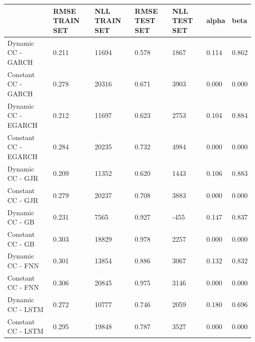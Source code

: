 \documentclass[a4paper, oneside]{discothesis}
\begin{document}
\begin{table}[!ht]\label{tbl_md_2}
    \centering
    \scriptsize
    \begin{tabular}{|p{3.5cm}||p{1.1cm}|p{1.1cm}|p{1.1cm}|p{1.1cm}||p{1.1cm}|p{1.1cm}|}
    \hline
      & RMSE TRAIN SET & NLL TRAIN SET & RMSE TEST SET & NLL TEST SET & alpha & beta \\ \hline\hline
        Dynamic CC - GARCH & 0.211 & 11694 & 0.578 & 1867 & 0.114 & 0.862 \\ \hline
        Constant CC - GARCH & 0.278 & 20316 & 0.671 & 3903 & 0.000 & 0.000 \\ \hline
        Dynamic CC - EGARCH & 0.212 & 11697 & 0.623 & 2753 & 0.104 & 0.884 \\ \hline
        Constant CC - EGARCH & 0.284 & 20235 & 0.732 & 4984 & 0.000 & 0.000 \\ \hline
        Dynamic CC - GJR & 0.209 & 11352 & 0.620 & 1443 & 0.106 & 0.883 \\ \hline
        Constant CC - GJR & 0.279 & 20237 & 0.708 & 3883 & 0.000 & 0.000 \\ \hline
        Dynamic CC - GB & 0.231 & 7565 & 0.927 & -455 & 0.147 & 0.837 \\ \hline
        Constant CC - GB & 0.303 & 18829 & 0.978 & 2257 & 0.000 & 0.000 \\ \hline
        Dynamic CC - FNN & 0.301 & 13854 & 0.886 & 3067 & 0.132 & 0.832 \\ \hline
        Constant CC - FNN & 0.306 & 20845 & 0.975 & 3146 & 0.000 & 0.000 \\ \hline
        Dynamic CC - LSTM & 0.272 & 10777 & 0.746 & 2059 & 0.180 & 0.696 \\ \hline
        Constant CC - LSTM & 0.295 & 19848 & 0.787 & 3527 & 0.000 & 0.000 \\ \hline
    \end{tabular}
\end{table}
\end{document}
